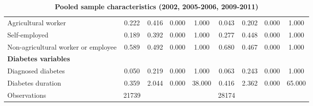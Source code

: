 \begin{table}[h!]
\begin{center}
{\begin{tabular}{l*{2}{cccc}}
Agricultural worker &       0.222&       0.416&       0.000&       1.000&       0.043&       0.202&       0.000&       1.000\\
Self-employed       &       0.189&       0.392&       0.000&       1.000&       0.277&       0.448&       0.000&       1.000\\
Non-agricultural worker or employee&       0.589&       0.492&       0.000&       1.000&       0.680&       0.467&       0.000&       1.000\\
\textbf{Diabetes variables} &&&&&&&& \\
Diagnosed diabetes  &       0.050&       0.219&       0.000&       1.000&       0.063&       0.243&       0.000&       1.000\\
Diabetes duration   &       0.359&       2.044&       0.000&      38.000&       0.416&       2.362&       0.000&      65.000\\
\midrule
Observations        &       21739&            &            &            &       28174&            &            &            \\
\bottomrule
\end{tabular} }
\caption{\label{tab:Pooled-sample-characteristics}\textbf{Pooled sample characteristics
(2002, 2005-2006, 2009-2011) }}
\end{center}
\end{table}

